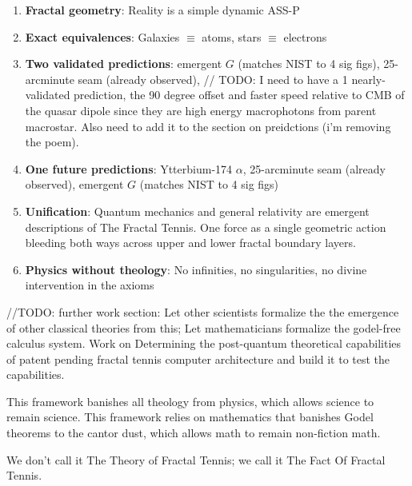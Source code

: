 \documentclass[11pt,a4paper]{article}
\begin{document}
\begin{enumerate}
\item \textbf{Fractal geometry}: Reality is a simple dynamic ASS-P
\item \textbf{Exact equivalences}: Galaxies $\equiv$ atoms, stars $\equiv$ electrons
\item \textbf{Two validated predictions}:  emergent $G$ (matches NIST to 4 sig figs), 25-arcminute seam (already observed),
// TODO: I need to have a 1 nearly-validated prediction, the 90 degree offset and faster speed relative to CMB of the quasar dipole since they are high energy macrophotons from parent macrostar. Also need to add it to the section on preidctions (i'm removing the poem).

\item \textbf{One future predictions}: Ytterbium-174 $\alpha$, 25-arcminute seam (already observed), emergent $G$ (matches NIST to 4 sig figs)
\item \textbf{Unification}: Quantum mechanics and general relativity are emergent descriptions of The Fractal Tennis. One force as a single geometric action bleeding both ways across upper and lower fractal boundary layers.
\item \textbf{Physics without theology}: No infinities, no singularities, no divine intervention in the axioms
\end{enumerate}


//TODO: further work section:
Let other scientists formalize the the emergence of other classical theories from this; Let mathematicians formalize the godel-free calculus system. Work on Determining the post-quantum theoretical capabilities of patent pending fractal tennis computer architecture and build it to test the capabilities.

This framework banishes all theology from physics, which allows science to remain science. This framework relies on mathematics that banishes Godel theorems to the cantor dust, which allows math to remain non-fiction math.

We don't call it The Theory of Fractal Tennis; we call it The Fact Of Fractal Tennis.
\end{document}
